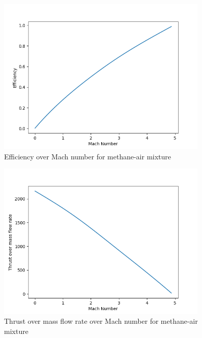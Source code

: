 \documentclass[a4paper,11pt]{article}
\begin{document}
	\begin{figure}[H]
		\centering
		\includegraphics[width=0.9\textwidth]{metan_pow(1mol)/Efficiency_over_Mach.png}
       		\caption{Efficiency over Mach number for methane-air mixture}
	\end{figure}
	\begin{figure}[H]
		\centering
		\includegraphics[width=0.9\textwidth]{metan_pow(1mol)/Thrust_over_mass_flow_rate_over_Mach.png}
       		\caption{Thrust over mass flow rate over Mach number for methane-air mixture}
	\end{figure}
\end{document}
